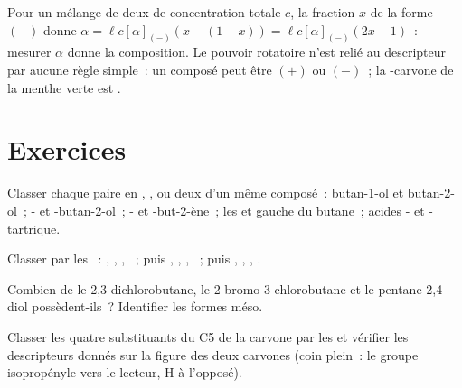 Pour un mélange de deux  de concentration totale $c$, la
fraction
$x$ de la forme $(-)$ donne $\alpha = \ell c[\alpha]_{(-)}(x - (1 - x)) =
\ell c[\alpha]_{(-)}(2x - 1)$~: mesurer $\alpha$ donne la composition.
Le pouvoir rotatoire n'est relié au descripteur par aucune règle
simple~: un composé  peut être $(+)$ ou $(-)$~; la
-carvone de la menthe verte est .

\section{Exercices}

\begin{exercise}[$\star$]\label{exo:b1:stereochemistry-in-depth:1}
Classer chaque paire en , ,
 ou deux  d'un même composé~: butan-1-ol
et butan-2-ol~; - et -butan-2-ol~; - et
-but-2-ène~; les  et gauche du butane~;
acides - et -tartrique.
\end{exercise}

\begin{exercise}[$\star$]\label{exo:b1:stereochemistry-in-depth:2}
Classer par les ~: , , , ~;
puis , , , ~; puis ,
, , .
\end{exercise}

\begin{exercise}[$\star$]\label{exo:b1:stereochemistry-in-depth:3}
Combien de  le 2,3-dichlorobutane, le
2-bromo-3-chlorobutane et le pentane-2,4-diol possèdent-ils~?
Identifier les formes méso.
\end{exercise}

\begin{exercise}[$\star$]\label{exo:b1:stereochemistry-in-depth:4}
Classer les quatre substituants du C5 de la carvone par les 
et vérifier les descripteurs donnés sur la figure des deux carvones (coin
plein~: le groupe isopropényle vers le lecteur, H à l'opposé).
\end{exercise}


